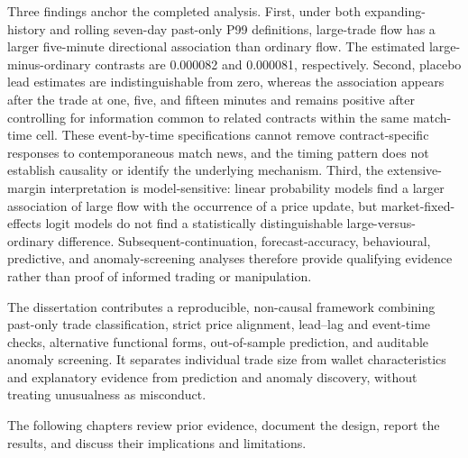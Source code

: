 Three findings anchor the completed analysis. First, under both expanding-history and rolling seven-day past-only P99 definitions, large-trade flow has a larger five-minute directional association than ordinary flow. The estimated large-minus-ordinary contrasts are 0.000082 and 0.000081, respectively. Second, placebo lead estimates are indistinguishable from zero, whereas the association appears after the trade at one, five, and fifteen minutes and remains positive after controlling for information common to related contracts within the same match-time cell. These event-by-time specifications cannot remove contract-specific responses to contemporaneous match news, and the timing pattern does not establish causality or identify the underlying mechanism. Third, the extensive-margin interpretation is model-sensitive: linear probability models find a larger association of large flow with the occurrence of a price update, but market-fixed-effects logit models do not find a statistically distinguishable large-versus-ordinary difference. Subsequent-continuation, forecast-accuracy, behavioural, predictive, and anomaly-screening analyses therefore provide qualifying evidence rather than proof of informed trading or manipulation.

The dissertation contributes a reproducible, non-causal framework combining past-only trade classification, strict price alignment, lead--lag and event-time checks, alternative functional forms, out-of-sample prediction, and auditable anomaly screening. It separates individual trade size from wallet characteristics and explanatory evidence from prediction and anomaly discovery, without treating unusualness as misconduct.

The following chapters review prior evidence, document the design, report the
results, and discuss their implications and limitations.
